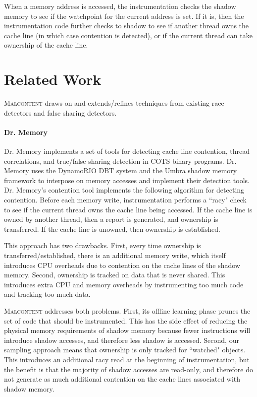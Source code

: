 \documentclass[letterpaper,twocolumn,10pt]{article}
\newcommand{\TextToolname}{Malcontent}
\newcommand{\Toolname}{\textsc{\TextToolname{}}}
\begin{document}
When a memory address is accessed, the instrumentation checks the shadow memory to see if the watchpoint for
the current address is set. If it is, then the instrumentation code further checks to shadow to see if another thread
owns the cache line (in which case contention is detected), or if the current thread can take ownership of the cache line.


\section{Related Work}\label{sec:background}
\Toolname{} draws on and extends/refines techniques from existing race detectors and false sharing detectors.

\paragraph{Dr. Memory}
Dr. Memory \cite{DrContention} implements a set of tools for detecting cache line contention, thread correlations,
and true/false sharing detection in COTS binary programs. Dr. Memory uses the DynamoRIO \cite{DynamoRIO} DBT system
and the Umbra shadow memory framework \cite{Umbra} to interpose on memory accesses and implement their
detection tools. Dr. Memory's contention tool implements the following algorithm for detecting contention. Before each
memory write,  instrumentation performs a ``racy" check to see if the current thread owns the cache line being accessed.
If the cache line is owned by another thread, then a report is generated, and ownership is transferred. If the cache line is
unowned, then ownership is established.

This approach has two drawbacks. First, every time ownership is transferred/established, there is an additional
memory write, which itself introduces CPU overheads due to contention on the cache lines of the shadow memory. Second,
ownership is tracked on data that is never shared. This introduces extra CPU and memory overheads by instrumenting
too much code and tracking too much data.

\Toolname{} addresses both problems. First, its offline learning phase prunes the set of code that should be instrumented.
This has the side effect of reducing the physical memory requirements of shadow memory because fewer instructions will
introduce shadow accesses, and therefore less shadow is accessed. Second, our sampling approach means that ownership
is only tracked for ``watched" objects. This introduces an additional racy read at the beginning of instrumentation, but the
benefit is that the majority of shadow accesses are read-only, and therefore do not generate as much additional contention
on the cache lines associated with shadow memory.
\end{document}

